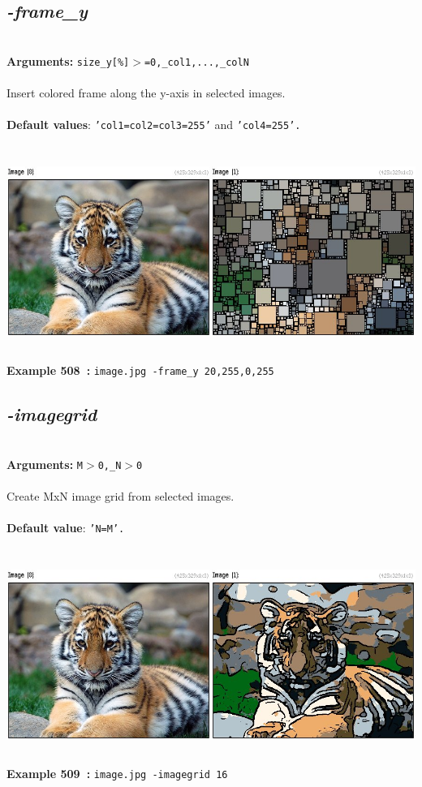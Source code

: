 \documentclass[a4paper,11pt,twoside]{book}
\begin{document}
\subsection{\emph{-frame\_y} }\vspace*{-0.5em}
~\\\textbf{Arguments: } 
{\small \texttt{size\_y[\%]$>$=0,\_col1,...,\_colN}}\\~\\
Insert colored frame along the y-axis in selected images.
~\\~\\\textbf{Default values}: {\small \texttt{'col1=col2=col3=255'} and \texttt{'col4=255'.}}
\begin{center}\includegraphics[keepaspectratio=true,height=7cm,width=\textwidth]{img/gmic_def508.jpg}\\
{\footnotesize \textbf{Example 508~:} \texttt{image.jpg -frame\_y 20,255,0,255}}
\end{center}

\subsection{\emph{-imagegrid} }\vspace*{-0.5em}
~\\\textbf{Arguments: } 
{\small \texttt{M$>$0,\_N$>$0}}\\~\\
Create MxN image grid from selected images.
~\\~\\\textbf{Default value}: {\small \texttt{'N=M'.}}
\begin{center}\includegraphics[keepaspectratio=true,height=7cm,width=\textwidth]{img/gmic_def509.jpg}\\
{\footnotesize \textbf{Example 509~:} \texttt{image.jpg -imagegrid 16}}
\end{center}
\end{document}
